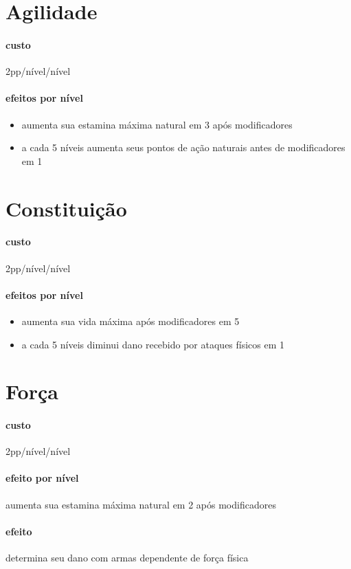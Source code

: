 \section{Agilidade}
\paragraph{custo} 2pp/nível/nível
\paragraph{efeitos por nível} 
\begin{itemize}
  \item aumenta sua estamina máxima natural em 3 após modificadores
  \item a cada 5 níveis aumenta seus pontos de ação naturais antes de modificadores em 1
\end{itemize}
%
%
\section{Constituição}
\paragraph{custo} 2pp/nível/nível
\paragraph{efeitos por nível} 
\begin{itemize}
  \item aumenta sua vida máxima após modificadores em 5
  \item a cada 5 níveis diminui dano recebido por ataques físicos em 1 
\end{itemize}
%
%
\section{Força}
\paragraph{custo} 2pp/nível/nível
\paragraph{efeito por nível} aumenta sua estamina máxima natural em 2 após modificadores
\paragraph{efeito} determina seu dano com armas dependente de força física
%
%
